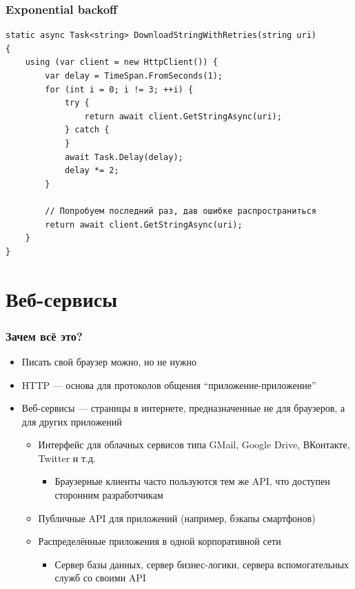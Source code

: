 \documentclass{../../slides-style}
\begin{document}
    \begin{frame}[fragile]
        \frametitle{Exponential backoff}
        \begin{footnotesize}
            \begin{verbatim}
static async Task<string> DownloadStringWithRetries(string uri)
{
    using (var client = new HttpClient()) {
        var delay = TimeSpan.FromSeconds(1);
        for (int i = 0; i != 3; ++i) {
            try {
                return await client.GetStringAsync(uri);
            } catch {
            }
            await Task.Delay(delay);
            delay *= 2;
        }

        // Попробуем последний раз, дав ошибке распространиться
        return await client.GetStringAsync(uri);
    }
}
            \end{verbatim}
        \end{footnotesize}
    \end{frame}

    \section{Веб-сервисы}

    \begin{frame}
        \frametitle{Зачем всё это?}
        \begin{itemize}
            \item Писать свой браузер можно, но не нужно
            \item HTTP --- основа для протоколов общения ``приложение-приложение''
            \item Веб-сервисы --- страницы в интернете, предназначенные не для браузеров, а для других приложений
            \begin{itemize}
                \item Интерфейс для облачных сервисов типа GMail, Google Drive, ВКонтакте, Twitter и т.д.
                \begin{itemize}
                    \item Браузерные клиенты часто пользуются тем же API, что доступен сторонним разработчикам
                \end{itemize}
                \item Публичные API для приложений (например, бэкапы смартфонов)
                \item Распределённые приложения в одной корпоративной сети
                \begin{itemize}
                    \item Сервер базы данных, сервер бизнес-логики, сервера вспомогательных служб со своими API
                \end{itemize}
            \end{itemize}
        \end{itemize}
    \end{frame}
\end{document}
